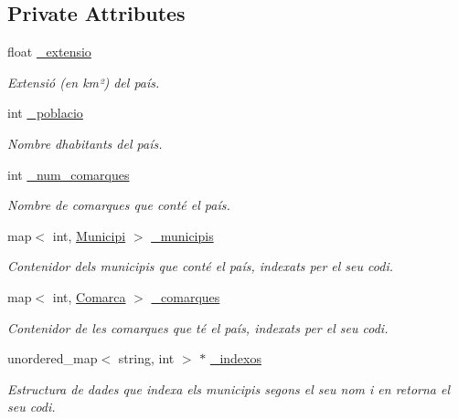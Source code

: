 \subsection*{Private Attributes}
\begin{DoxyCompactItemize}
\item 
\mbox{\label{classPais_a54094f033cec9a495d8f41b7f4af61da}} 
float \hyperlink{classPais_a54094f033cec9a495d8f41b7f4af61da}{\+\_\+extensio}
\begin{DoxyCompactList}\small\item\em Extensió (en km²) del país. \end{DoxyCompactList}\item 
\mbox{\label{classPais_a262050bd533313724c46b392742bdb66}} 
int \hyperlink{classPais_a262050bd533313724c46b392742bdb66}{\+\_\+poblacio}
\begin{DoxyCompactList}\small\item\em Nombre d\textquotesingle{}habitants del país. \end{DoxyCompactList}\item 
\mbox{\label{classPais_a30dfbffec25b05481ff382620110ab9f}} 
int \hyperlink{classPais_a30dfbffec25b05481ff382620110ab9f}{\+\_\+num\+\_\+comarques}
\begin{DoxyCompactList}\small\item\em Nombre de comarques que conté el país. \end{DoxyCompactList}\item 
\mbox{\label{classPais_aabe27b382d94943a3d3ba692ecd5d96d}} 
map$<$ int, \hyperlink{classMunicipi}{Municipi} $>$ \hyperlink{classPais_aabe27b382d94943a3d3ba692ecd5d96d}{\+\_\+municipis}
\begin{DoxyCompactList}\small\item\em Contenidor dels municipis que conté el país, indexats per el seu codi. \end{DoxyCompactList}\item 
\mbox{\label{classPais_af9a510da1a2c140819afc7466d5e59cd}} 
map$<$ int, \hyperlink{classComarca}{Comarca} $>$ \hyperlink{classPais_af9a510da1a2c140819afc7466d5e59cd}{\+\_\+comarques}
\begin{DoxyCompactList}\small\item\em Contenidor de les comarques que té el país, indexats per el seu codi. \end{DoxyCompactList}\item 
\mbox{\label{classPais_ad99e3ba63461fa6e60d0cd5fddc98948}} 
unordered\+\_\+map$<$ string, int $>$ $\ast$ \hyperlink{classPais_ad99e3ba63461fa6e60d0cd5fddc98948}{\+\_\+indexos}
\begin{DoxyCompactList}\small\item\em Estructura de dades que indexa els municipis segons el seu nom i en retorna el seu codi. \end{DoxyCompactList}\end{DoxyCompactItemize}


